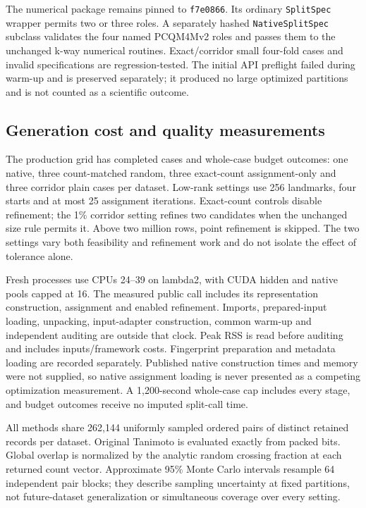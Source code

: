 

The numerical package remains pinned to \texttt{f7e0866}. Its ordinary
\texttt{SplitSpec} wrapper permits two or three roles. A separately hashed
\texttt{NativeSplitSpec} subclass validates the four named PCQM4Mv2 roles and
passes them to the unchanged k-way numerical routines. Exact/corridor small
four-fold cases and invalid specifications are regression-tested. The initial
API preflight failed during warm-up and is preserved separately; it produced
no large optimized partitions and is not counted as a scientific outcome.

\subsection{Generation cost and quality measurements}

The production grid has \NativeCompletedCases{} completed cases and
\NativeBudgetOutcomes{} whole-case budget outcomes: one native, three
count-matched random, three exact-count assignment-only and three corridor
plain cases per dataset. Low-rank settings use 256 landmarks, four starts and
at most 25 assignment iterations. Exact-count controls disable refinement;
the 1\% corridor setting refines two candidates when the unchanged size rule
permits it. Above two million rows, point refinement is skipped. The two
settings vary both feasibility and refinement work and do not isolate the
effect of tolerance alone.

Fresh processes use CPUs 24--39 on lambda2, with CUDA hidden and native pools
capped at 16. The measured public call includes its representation construction,
assignment and enabled refinement. Imports, prepared-input loading, unpacking,
input-adapter construction, common warm-up and independent auditing are outside
that clock. Peak RSS is read before auditing and includes inputs/framework costs.
Fingerprint preparation and metadata loading are recorded separately. Published
native construction times and memory were not supplied, so native assignment
loading is never presented as a competing optimization measurement. A
1,200-second whole-case cap includes every stage, and budget outcomes receive
no imputed split-call time.

All methods share 262,144 uniformly sampled ordered pairs of distinct retained
records per dataset. Original Tanimoto is evaluated exactly from packed bits.
Global overlap is normalized by the analytic random crossing fraction at each
returned count vector. Approximate 95\% Monte Carlo intervals resample 64
independent pair blocks; they describe sampling uncertainty at fixed partitions,
not future-dataset generalization or simultaneous coverage over every setting.

